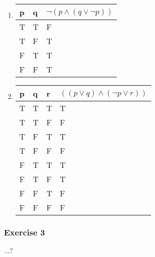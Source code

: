 \begin{solution}
\begin{enumerate}
    \item{
        \begin{tabular}[c]{l l |l}
        p & q & $\neg (p \wedge (q \vee \neg p))$ \\ \hline
        T & T & F \\
        T & F & T \\
        F & T & T \\
        F & F & T
        \end{tabular}
    }
    
    \item{
        \begin{tabular}[c]{l l l | l}
        p & q & r & $((p \vee q) \wedge (\neg p \vee r))$ \\ \hline
        T & T & T & T \\
        T & T & F & F \\
        T & F & T & T \\
        T & F & F & F \\
        F & T & T & T \\
        F & T & F & T \\
        F & F & T & F \\
        F & F & F & F
        \end{tabular}
    }
    \end{enumerate}
\end{solution}

\subsubsection{Exercise 3}
\question ...?


